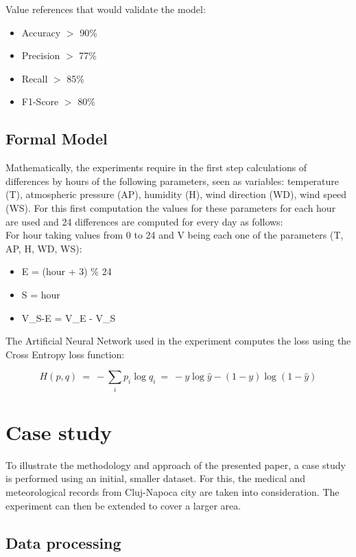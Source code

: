 \documentclass{article}
\begin{document}
Value references that would validate the model:
\begin{itemize}
    \item Accuracy $>$ 90\%
    \item Precision $>$ 77\%
    \item Recall $>$ 85\%
    \item F1-Score $>$ 80\%
\end{itemize}

\subsection{Formal Model}

Mathematically, the experiments require in the first step calculations of differences by hours of the following parameters, seen as variables: temperature (T), atmospheric pressure (AP), humidity (H), wind direction (WD), wind speed (WS). For this first computation the values for these parameters for each hour are used and 24 differences are computed for every day as follows: 
\\

For hour taking values from 0 to 24 and V being each one of the parameters (T, AP, H, WD, WS):
\begin{itemize}
    \item E = (hour + 3) \% 24
    \item S = hour 
    \item V\_S-E = V\_E - V\_S 
\end{itemize}

The Artificial Neural Network used in the experiment computes the loss using the Cross Entropy loss function:

\begin{equation}
     H(p,q)\ =\ -\sum _{i}p_{i}\log q_{i}\ =\ -y\log {\hat {y}}-(1-y)\log(1-{\hat {y}})
\end{equation}


\section{Case study}

To illustrate the methodology and approach of the presented paper, a case study is performed using an initial, smaller dataset. For this, the medical and meteorological records from Cluj-Napoca city are taken into consideration. The experiment can then be extended to cover a larger area.

\subsection{Data processing}
\end{document}
